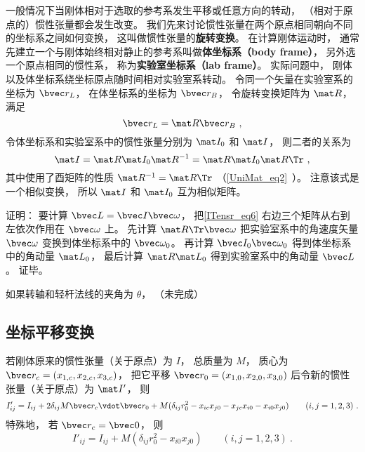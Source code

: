一般情况下当刚体相对于选取的参考系发生平移或任意方向的转动， （相对于原点的）惯性张量都会发生改变。  我们先来讨论惯性张量在两个原点相同朝向不同的坐标系之间如何变换， 这叫做惯性张量的\textbf{旋转变换}。 在计算刚体运动时， 通常先建立一个与刚体始终相对静止的参考系叫做\textbf{体坐标系（body frame）}， 另外选一个原点相同的惯性系， 称为\textbf{实验室坐标系（lab frame）}。 实际问题中， 刚体以及体坐标系绕坐标原点随时间相对实验室系转动。 令同一个矢量在实验室系的坐标为 $\bvec r_{L}$， 在体坐标系的坐标为 $\bvec r_{B}$， 令旋转变换矩阵为 $\mat R$， 满足
\begin{equation}
\bvec r_L = \mat R\bvec r_B~,
\end{equation}
令体坐标系和实验室系中的惯性张量分别为 $\mat I_0$ 和 $\mat I$， 则二者的关系为
\begin{equation}\label{ITensr_eq6}
\mat I = \mat R \mat I_0 \mat R^{-1} = \mat R \mat I_0 \mat R\Tr~,
\end{equation}
其中使用了酉矩阵的性质 $\mat R^{-1} = \mat R\Tr$ （\autoref{UniMat_eq2}~）。 注意该式是一个相似变换， 所以 $\mat I$ 和 $\mat I_0$ 互为相似矩阵。

证明： 要计算 $\bvec L = \bvec I \bvec \omega$， 把\autoref{ITensr_eq6} 右边三个矩阵从右到左依次作用在 $\bvec \omega$ 上。 先计算 $\mat R\Tr \bvec \omega$ 把实验室系中的角速度矢量 $\bvec \omega$ 变换到体坐标系中的 $\bvec \omega_0$。 再计算 $\bvec I_0 \bvec \omega_0$ 得到体坐标系中的角动量 $\mat L_0$， 最后计算 $\mat R \mat L_0$ 得到实验室系中的角动量 $\bvec L$。 证毕。

\begin{example}{}
如果转轴和轻杆法线的夹角为 $\theta$， （未完成）
\end{example}

\subsection{坐标平移变换}
若刚体原来的惯性张量（关于原点）为 $I$， 总质量为 $M$， 质心为 $\bvec r_c = (x_{1,c}, x_{2,c}, x_{3,c})$， 把它平移 $\bvec r_0 = (x_{1,0}, x_{2,0}, x_{3,0})$ 后令新的惯性张量（关于原点）为 $\mat I'$， 则
\begin{equation}\label{ITensr_eq7}
I'_{ij} = I_{ij} + 2 \delta_{ij} M\bvec r_c\vdot \bvec r_0 + M(\delta_{ij}r_0^2 - x_{ic}x_{j0} - x_{jc}x_{i0} - x_{i0}x_{j0})\qquad (i, j = 1, 2, 3)~.
\end{equation}
特殊地， 若 $\bvec r_c = \bvec 0$， 则
\begin{equation}
I'_{ij} = I_{ij} + M(\delta_{ij}r_0^2 - x_{i0}x_{j0})\qquad (i, j = 1, 2, 3)~.
\end{equation}


